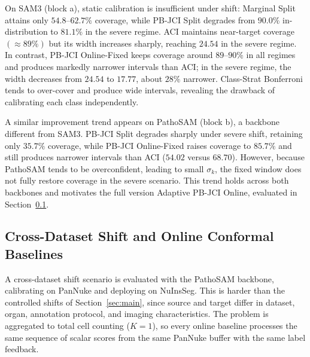 \documentclass[smallextended,natbib]{svjour3}
\begin{document}
On SAM3 (block a), static calibration is insufficient under shift: Marginal Split
attains only \(54.8\)--\(62.7\%\) coverage, while PB-JCI Split degrades from
\(90.0\%\) in-distribution to \(81.1\%\) in the severe regime. ACI maintains
near-target coverage \((\approx 89\%)\) but its width increases sharply, reaching
\(24.54\) in the severe regime. In contrast, PB-JCI Online-Fixed keeps coverage
around \(89\)--\(90\%\) in all regimes and produces markedly narrower intervals than
ACI; in the severe regime, the width decreases from \(24.54\) to \(17.77\), about
\(28\%\) narrower. Class-Strat Bonferroni tends to over-cover and produce wide
intervals, revealing the drawback of calibrating each class independently.

A similar improvement trend appears on PathoSAM (block b), a backbone different from
SAM3. PB-JCI Split degrades sharply under severe shift, retaining only \(35.7\%\)
coverage, while PB-JCI Online-Fixed raises coverage to \(85.7\%\) and still produces
narrower intervals than ACI (\(54.02\) versus \(68.70\)). However, because PathoSAM
tends to be overconfident, leading to small \(\sigma_k\), the fixed window does not
fully restore coverage in the severe scenario. This trend holds across both
backbones and motivates the full version Adaptive PB-JCI Online, evaluated in
Section~\ref{sec:cross}.

\subsection{Cross-Dataset Shift and Online Conformal Baselines}\label{sec:cross}

A cross-dataset shift scenario is evaluated with the PathoSAM backbone, calibrating
on PanNuke and deploying on NuInsSeg. This is harder than the controlled shifts of
Section~\ref{sec:main}, since source and target differ in dataset, organ, annotation
protocol, and imaging characteristics. The problem is aggregated to total cell
counting (\(K=1\)), so every online baseline processes the same sequence of scalar
scores from the same PanNuke buffer with the same label feedback.
\end{document}
